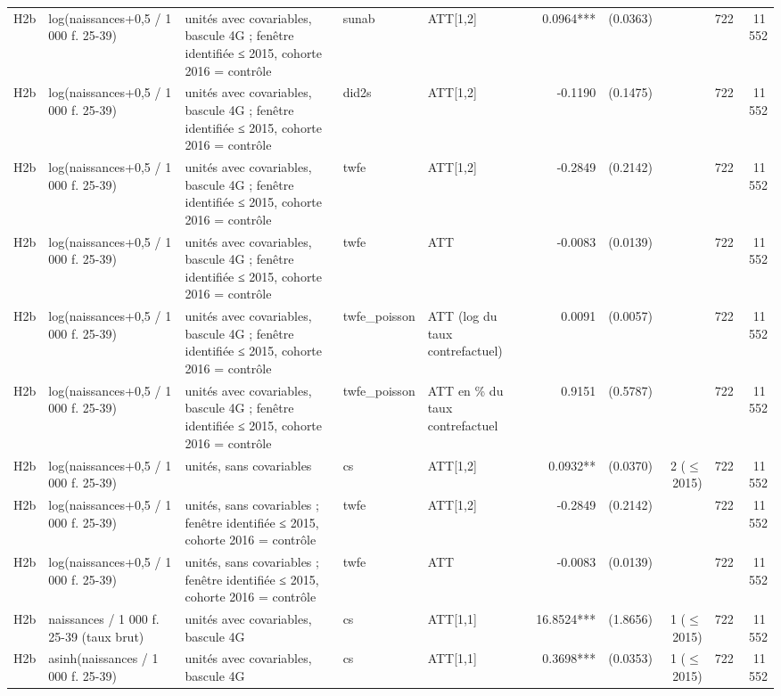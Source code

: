 \begin{table}
\begin{threeparttable}
\begin{tabular}{lp{4.0cm}p{6.1cm}lp{3.6cm}rrrrr}
H2b & log(naissances+0,5 / 1 000 f. 25-39) & unités avec covariables, bascule 4G ; fenêtre identifiée ≤ 2015, cohorte 2016 = contrôle & sunab & ATT[1,2] & 0.0964*** & (0.0363) &  & 722 & 11\,552 \\
H2b & log(naissances+0,5 / 1 000 f. 25-39) & unités avec covariables, bascule 4G ; fenêtre identifiée ≤ 2015, cohorte 2016 = contrôle & did2s & ATT[1,2] & -0.1190 & (0.1475) &  & 722 & 11\,552 \\
H2b & log(naissances+0,5 / 1 000 f. 25-39) & unités avec covariables, bascule 4G ; fenêtre identifiée ≤ 2015, cohorte 2016 = contrôle & twfe & ATT[1,2] & -0.2849 & (0.2142) &  & 722 & 11\,552 \\
H2b & log(naissances+0,5 / 1 000 f. 25-39) & unités avec covariables, bascule 4G ; fenêtre identifiée ≤ 2015, cohorte 2016 = contrôle & twfe & ATT & -0.0083 & (0.0139) &  & 722 & 11\,552 \\
H2b & log(naissances+0,5 / 1 000 f. 25-39) & unités avec covariables, bascule 4G ; fenêtre identifiée ≤ 2015, cohorte 2016 = contrôle & twfe\_poisson & ATT (log du taux contrefactuel) & 0.0091 & (0.0057) &  & 722 & 11\,552 \\
H2b & log(naissances+0,5 / 1 000 f. 25-39) & unités avec covariables, bascule 4G ; fenêtre identifiée ≤ 2015, cohorte 2016 = contrôle & twfe\_poisson & ATT en \% du taux contrefactuel & 0.9151 & (0.5787) &  & 722 & 11\,552 \\
H2b & log(naissances+0,5 / 1 000 f. 25-39) & unités, sans covariables & cs & ATT[1,2] & 0.0932** & (0.0370) & 2 ($\leq$ 2015) & 722 & 11\,552 \\
H2b & log(naissances+0,5 / 1 000 f. 25-39) & unités, sans covariables ; fenêtre identifiée ≤ 2015, cohorte 2016 = contrôle & twfe & ATT[1,2] & -0.2849 & (0.2142) &  & 722 & 11\,552 \\
H2b & log(naissances+0,5 / 1 000 f. 25-39) & unités, sans covariables ; fenêtre identifiée ≤ 2015, cohorte 2016 = contrôle & twfe & ATT & -0.0083 & (0.0139) &  & 722 & 11\,552 \\
H2b & naissances / 1 000 f. 25-39 (taux brut) & unités avec covariables, bascule 4G & cs & ATT[1,1] & 16.8524*** & (1.8656) & 1 ($\leq$ 2015) & 722 & 11\,552 \\
H2b & asinh(naissances / 1 000 f. 25-39) & unités avec covariables, bascule 4G & cs & ATT[1,1] & 0.3698*** & (0.0353) & 1 ($\leq$ 2015) & 722 & 11\,552 \\
\bottomrule
\end{tabular}
\begin{tablenotes}\footnotesize

\end{tablenotes}
\end{threeparttable}
\end{table}
